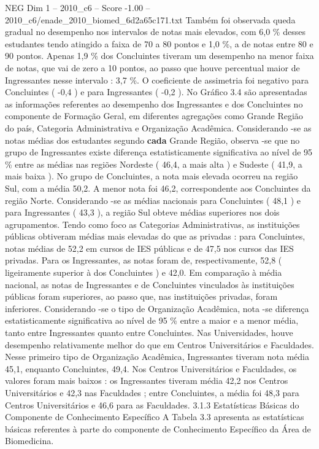 \begin{textsample}{NEG Dim 1 – 2010\_c6 – Score -1.00 – 2010\_c6/enade\_2010\_biomed\_6d2a65c171.txt}
Também foi observada queda gradual no desempenho nos intervalos de notas mais elevados, com 6,0 \% desses estudantes tendo atingido a faixa de 70 a 80 pontos e 1,0 \%, a de notas entre 80 e 90 pontos.
Apenas 1,9 \% dos Concluintes tiveram um desempenho na menor faixa de notas, que vai de zero a 10 pontos, ao passo que houve percentual maior de Ingressantes nesse intervalo : 3,7 \%.
O coeficiente de assimetria foi negativo para Concluintes ( -0,4 ) e para Ingressantes ( -0,2 ).
No Gráfico 3.4 são apresentadas as informações referentes ao desempenho dos Ingressantes e dos Concluintes no componente de Formação Geral, em diferentes agregações como Grande Região do país, Categoria Administrativa e Organização Acadêmica.
Considerando -se as notas médias dos estudantes segundo \textbf{cada} Grande Região, observa -se que no grupo de Ingressantes existe diferença estatisticamente significativa ao nível de 95 \% entre as médias nas regiões Nordeste ( 46,4, a mais alta ) e Sudeste ( 41,9, a mais baixa ).
No grupo de Concluintes, a nota mais elevada ocorreu na região Sul, com a média 50,2.
A menor nota foi 46,2, correspondente aos Concluintes da região Norte.
Considerando -se as médias nacionais para Concluintes ( 48,1 ) e para Ingressantes ( 43,3 ), a região Sul obteve médias superiores nos dois agrupamentos.
Tendo como foco as Categorias Administrativas, as instituições públicas obtiveram médias mais elevadas do que as privadas : para Concluintes, notas médias de 52,2 em cursos de IES públicas e de 47,5 nos cursos das IES privadas.
Para os Ingressantes, as notas foram de, respectivamente, 52,8 ( ligeiramente superior à dos Concluintes ) e 42,0.
Em comparação à média nacional, as notas de Ingressantes e de Concluintes vinculados às instituições públicas foram superiores, ao passo que, nas instituições privadas, foram inferiores.
Considerando -se o tipo de Organização Acadêmica, nota -se diferença estatisticamente significativa ao nível de 95 \% entre a maior e a menor média, tanto entre Ingressantes quanto entre Concluintes.
Nas Universidades, houve desempenho relativamente melhor do que em Centros Universitários e Faculdades.
Nesse primeiro tipo de Organização Acadêmica, Ingressantes tiveram nota média 45,1, enquanto Concluintes, 49,4.
Nos Centros Universitários e Faculdades, os valores foram mais baixos : os Ingressantes tiveram média 42,2 nos Centros Universitários e 42,3 nas Faculdades ; entre Concluintes, a média foi 48,3 para Centros Universitários e 46,6 para as Faculdades. 3.1.3 Estatísticas Básicas do Componente de Conhecimento Específico A Tabela 3.3 apresenta as estatísticas básicas referentes à parte do componente de Conhecimento Específico da Área de Biomedicina.

\end{textsample}
